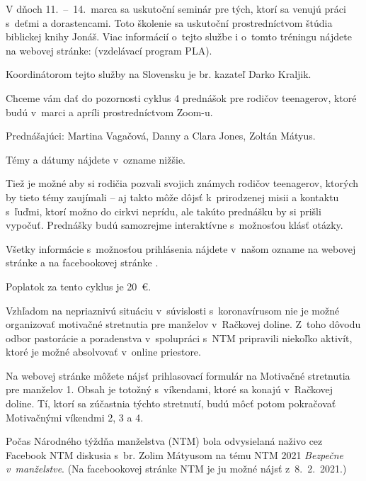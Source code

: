 V dňoch 11.~--~14.~marca sa uskutoční seminár pre tých, ktorí sa venujú práci s~deťmi a dorastencami. Toto školenie sa uskutoční prostredníctvom štúdia biblickej knihy Jonáš. Viac informácií o~tejto službe i o~tomto tréningu nájdete na webovej stránke:  (vzdelávací program PLA).

Koordinátorom tejto služby na Slovensku je br. kazateľ Darko Kraljik.


Chceme vám dať do pozornosti cyklus 4 prednášok pre rodičov teenagerov, ktoré budú v~marci a apríli prostredníctvom Zoom-u.

Prednášajúci: Martina Vagačová, Danny a Clara Jones, Zoltán Mátyus.

Témy a dátumy nájdete v~ozname nižšie.

Tiež je možné aby si rodičia pozvali svojich známych rodičov teenagerov, ktorých by tieto témy zaujímali – aj takto môže dôjsť k~prirodzenej misii a kontaktu s~ľuďmi, ktorí možno do cirkvi neprídu, ale takúto prednášku by si prišli vypočuť. Prednášky budú samozrejme interaktívne s~možnosťou klásť otázky.

Všetky informácie s~možnosťou prihlásenia nájdete v~našom ozname na webovej stránke  a na facebookovej stránke .

Poplatok za tento cyklus je 20~€.
\vfill\break


Vzhľadom na nepriaznivú situáciu v~súvislosti s~koronavírusom nie je možné organizovať motivačné stretnutia pre manželov v~Račkovej doline. Z~toho dôvodu odbor pastorácie a poradenstva v~spolupráci s~NTM pripravili niekoľko aktivít, ktoré je možné absolvovať v~online priestore.

Na webovej stránke  môžete nájsť prihlasovací formulár na Motivačné stretnutia pre manželov 1. Obsah je totožný s~víkendami, ktoré sa konajú v~Račkovej doline. Tí, ktorí sa zúčastnia týchto stretnutí, budú môcť potom pokračovať Motivačnými víkendmi 2, 3 a 4.

Počas Národného týždňa manželstva (NTM) bola odvysielaná naživo cez Facebook NTM diskusia s~br. Zolim Mátyusom na tému NTM 2021 {\it Bezpečne v~manželstve}. (Na facebookovej stránke NTM je ju možné nájsť z~8.~2.~2021.)

